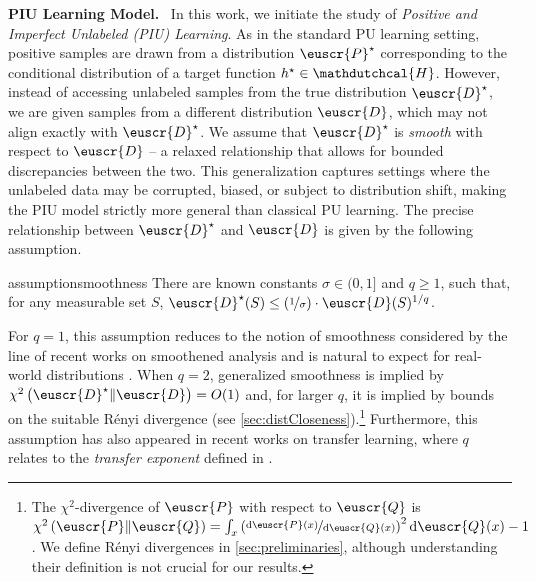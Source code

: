 \documentclass[11pt]{article}
\theoremstyle{plain}
\theoremstyle{definition}
\theoremstyle{remark}
\newcommand{\inparen}[1]{\left(#1\right)}
\newcommand{\chidiv}[2]{\chi^2\inparen{#1\|#2}}
\newcommand{\sfrac}[2]{{#1/#2}}
\newcommand{\nfrac}[2]{\nicefrac{#1}{#2}}
\newcommand{\customcal}[1]{\euscr{#1}}
\newcommand{\cD}{\customcal{D}}
\newcommand{\cP}{\customcal{P}}
\newcommand{\cQ}{\customcal{Q}}
\renewcommand{\paragraph}[1]{\medskip \noindent\textbf{#1}~}
\newcommand{\hypo}[1]{\mathdutchcal{#1}}
\newcommand{\hyH}{\hypo{H}}
\renewcommand{\d}{{\rm d}}
\newcommand{\cDtrue}{\cD^\star}
\newcommand{\cDgiven}{\cD}
\newcommand{\cPtrue}{\cP^\star}
\begin{document}
\paragraph{PIU Learning Model.} In this work, we initiate the study of \textit{Positive and Imperfect Unlabeled (PIU) Learning}. As in the standard PU learning setting, positive samples are drawn from a distribution $\cPtrue$ corresponding to the conditional distribution of a target function $h^\star \in \hyH$. However, instead of accessing unlabeled samples from the true distribution $\cDtrue$, we are given samples from a different distribution $\cDgiven$, which may not align exactly with $\cDtrue$. We assume that $\cDtrue$ is \textit{smooth} with respect to $\cDgiven$ -- a relaxed relationship that allows for bounded discrepancies between the two. This generalization captures settings where the unlabeled data may be corrupted, biased, or subject to distribution shift, making the PIU model strictly more general than classical PU learning. The precise relationship between $\cDtrue$ and $\cDgiven$ is given by the following assumption.
\begin{restatable}{assumption}{smoothness}\label{asmp:smoothness}
    There are known constants $\sigma \in (0,1]$ and $q\geq 1$, such that, for any measurable set $S$, $\cDtrue(S)\leq {(\nfrac{1}{\sigma})}\cdot \cDgiven(S)^{\sfrac{1}{q}}$.
\end{restatable}
For $q=1$, this assumption reduces to the notion of smoothness considered by the line of recent works on smoothened analysis and is natural to expect for real-world  distributions \cite{manthey2020smoothed,haghtalab2022efficientSmooth,haghtalab2020smooth,haghtalab2024smoothJACM,block2024performanceempiricalriskminimization,blanchard2024agnostic}. When $q=2$, generalized smoothness is implied by $\chidiv{\cDtrue}{\cD} = O(1)$ and, for larger $q$, it is implied by bounds on the suitable Rényi divergence (see \cref{sec:distCloseness}).\footnote{The $\chi^2$-divergence of $\cP$ with respect to $\cQ$ is $\chidiv{\cP}{\cQ}=\int_x \inparen{\nfrac{\d \cP(x)}{\d \cQ(x)}}^2 \d \cQ(x) - 1$. We define Rényi divergences in \cref{sec:preliminaries}, although understanding their definition is not crucial for our results.} Furthermore, this assumption has also appeared in recent works on transfer learning, where $q$ relates to the \textit{transfer exponent} defined in \cite{hanneke_kpotufe_2019_transfer_exp,pmlr-v195-hanneke23c,hanneke2024unifiedtheorytransferlearning}.
\smallskip
\end{document}
